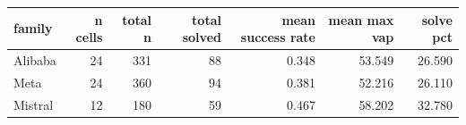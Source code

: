 \begin{tabular}{lrrrrrr}
\toprule
family & n cells & total n & total solved & mean success rate & mean max vap & solve pct \\
\midrule
Alibaba & 24 & 331 & 88 & 0.348 & 53.549 & 26.590 \\
Meta & 24 & 360 & 94 & 0.381 & 52.216 & 26.110 \\
Mistral & 12 & 180 & 59 & 0.467 & 58.202 & 32.780 \\
\bottomrule
\end{tabular}

